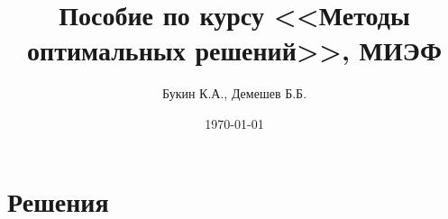 \documentclass{article}
\title{Пособие по курсу <<Методы оптимальных решений>>, МИЭФ}
\author{Букин К.А., Демешев Б.Б.}
\date{\today}
\begin{document}
\maketitle %
\tableofcontents


\problemonly


\restoresection
\section{Решения}

\solutiononly

\end{document}
